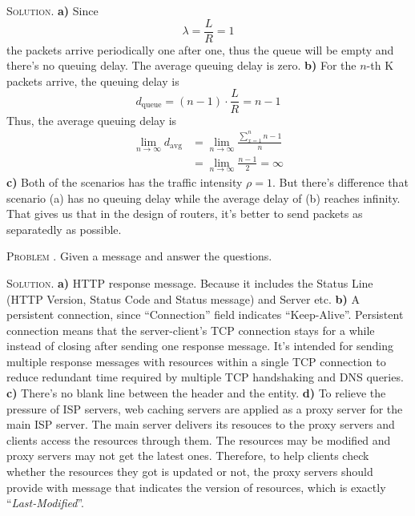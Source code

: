 \documentclass[12pt, a4paper, oneside]{article}
\newcounter{problemname}
\newenvironment{problem}{\stepcounter{problemname}\par\noindent\textsc{Problem \arabic{problemname}. }}{\\\par}
\newenvironment{solution}{\par\noindent\textsc{Solution. }}{\\\par}
\begin{document}
\begin{solution}
    \textbf{a)} Since
    \begin{equation*}
        \lambda = \frac{L}{R} = 1
    \end{equation*}
    the packets arrive periodically one after one, thus the queue will be empty and there's no queuing delay. The average queuing delay is zero.
    \newline\textbf{b)} For the $n$-th K packets arrive, the queuing delay is
    \begin{equation*}
        d_{\text{queue}} = (n-1)\cdot\frac{L}{R} = n-1
    \end{equation*}
    Thus, the average queuing delay is
    \begin{align*}
        \lim_{n\to\infty}d_{\text{avg}} &= \lim_{n\to\infty}\frac{\sum_{x=1}^n n-1}{n} \\
        &= \lim_{n\to\infty} \frac{n-1}{2} = \infty
    \end{align*}
    \newline\textbf{c)} Both of the scenarios has the traffic intensity $\rho = 1$. But there's difference that scenario (a) has no queuing delay while the average delay of (b) reaches infinity. That gives us that in the design of routers, it's better to send packets as separatedly as possible.
\end{solution}

\begin{problem}
    Given a message and answer the questions.
\end{problem}

\begin{solution}
    \textbf{a)} HTTP response message. Because it includes the Status Line (HTTP Version, Status Code and Status message) and Server etc.\newline
    \textbf{b)} A persistent connection, since ``Connection'' field indicates ``Keep-Alive''. Persistent connection means that the server-client's TCP connection stays for a while instead of closing after sending one response message. It's intended for sending multiple response messages with resources within a single TCP connection to reduce redundant time required by multiple TCP handshaking and DNS queries.\newline
    \textbf{c)} There's no blank line between the header and the entity.\newline
    \textbf{d)} To relieve the pressure of ISP servers, web caching servers are applied as a proxy server for the main ISP server. The main server delivers its resouces to the proxy servers and clients access the resources through them. The resources may be modified and proxy servers may not get the latest ones. Therefore, to help clients check whether the resources they got is updated or not, the proxy servers should provide with message that indicates the version of resources, which is exactly ``\textit{Last-Modified}''.\newline
\end{solution}
\end{document}
